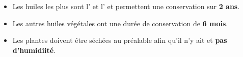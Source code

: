\begin{Remarque}[]%
    \begin{itemize}[label=\faPen]
        \item Les huiles les plus  sont l' et l' et permettent une conservation sur \textbf{2 ans}. \\
        \item Les autres huiles végétales ont une durée de conservation de \textbf{6 mois}.
        \item Les plantes doivent être séchées au préalable afin qu'il n'y ait  et \textbf{pas d'humidiité}.
    \end{itemize}
\end{Remarque}